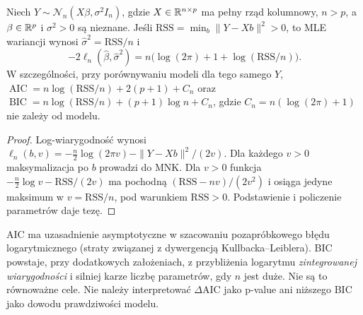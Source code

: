 \begin{twierdzenie}
\label{thm:aic-gaussian}
Niech $Y\sim\mathcal N_n(X\beta,\sigma^2I_n)$, gdzie
$X\in\mathbb R^{n\times p}$ ma pełny rząd kolumnowy, $n>p$,
a $\beta\in\mathbb R^p$ i $\sigma^2>0$ są nieznane.
Jeśli $\mathrm{RSS}=\min_b\|Y-Xb\|^2>0$, to MLE wariancji
wynosi $\widehat\sigma^2=\mathrm{RSS}/n$ i
\[
 -2\ell_n(\widehat\beta,\widehat\sigma^2)
 =n\bigl(\log(2\pi)+1+\log(\mathrm{RSS}/n)\bigr).
\]
W szczególności, przy porównywaniu modeli dla tego samego $Y$,
$\operatorname{AIC}=n\log(\mathrm{RSS}/n)+2(p+1)+C_n$ oraz
$\operatorname{BIC}=n\log(\mathrm{RSS}/n)+(p+1)\log n+C_n$,
gdzie $C_n=n(\log(2\pi)+1)$ nie zależy od modelu.
\end{twierdzenie}
\begin{proof}
Log-wiarygodność wynosi
$\ell_n(b,v)=-\tfrac n2\log(2\pi v)-\|Y-Xb\|^2/(2v)$.
Dla każdego $v>0$ maksymalizacja po $b$ prowadzi do MNK.
Dla $v>0$ funkcja $-\tfrac n2\log v-\mathrm{RSS}/(2v)$
ma pochodną $(\mathrm{RSS}-nv)/(2v^2)$ i osiąga
jedyne maksimum w $v=\mathrm{RSS}/n$, pod warunkiem
$\mathrm{RSS}>0$. Podstawienie i policzenie parametrów daje tezę.
\end{proof}

\begin{uwaga}
AIC ma uzasadnienie asymptotyczne w szacowaniu pozapróbkowego
błędu logarytmicznego (straty związanej z dywergencją
Kullbacka--Leiblera). BIC powstaje, przy dodatkowych
założeniach, z przybliżenia logarytmu \emph{zintegrowanej
wiarygodności} i silniej karze liczbę parametrów, gdy $n$
jest duże. Nie są to równoważne cele. Nie należy
interpretować $\Delta\mathrm{AIC}$ jako p-value ani niższego BIC
jako dowodu prawdziwości modelu.
\end{uwaga}

